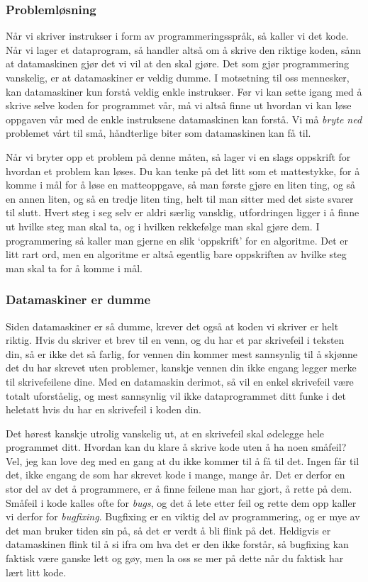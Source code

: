 \documentclass[a4paper, 11pt, notitlepage]{article}
\begin{document}
\subsubsection*{Problemløsning}

Når vi skriver instrukser i form av programmeringsspråk, så kaller vi det kode. Når vi lager et dataprogram, så handler altså om å skrive den riktige koden, sånn at datamaskinen gjør det vi vil at den skal gjøre. Det som gjør programmering vanskelig, er at datamaskiner er veldig dumme. I motsetning til oss mennesker, kan datamaskiner kun forstå veldig enkle instrukser. Før vi kan sette igang med å skrive selve koden for programmet vår, må vi altså finne ut hvordan vi kan løse oppgaven vår med de enkle instruksene datamaskinen kan forstå. Vi må \emph{bryte ned} problemet vårt til små, håndterlige biter som datamaskinen kan få til.

Når vi bryter opp et problem på denne måten, så lager vi en slags oppskrift for hvordan et problem kan løses. Du kan tenke på det litt som et mattestykke, for å komme i mål for å løse en matteoppgave, så man første gjøre en liten ting, og så en annen liten, og så en tredje liten ting, helt til man sitter med det siste svarer til slutt. Hvert steg i seg selv er aldri særlig vansklig, utfordringen ligger i å finne ut hvilke steg man skal ta, og i hvilken rekkefølge man skal gjøre dem. I programmering så kaller man gjerne en slik `oppskrift' for en algoritme. Det er litt rart ord, men en algoritme er altså egentlig bare oppskriften av hvilke steg man skal ta for å komme i mål.

\subsubsection*{Datamaskiner er dumme}

Siden datamaskiner er så dumme, krever det også at koden vi skriver er helt riktig. Hvis du skriver et brev til en venn, og du har et par skrivefeil i teksten din, så er ikke det så farlig, for vennen din kommer mest sannsynlig til å skjønne det du har skrevet uten problemer, kanskje vennen din ikke engang legger merke til skrivefeilene dine. Med en datamaskin derimot, så vil en enkel skrivefeil være totalt uforståelig, og mest sannsynlig vil ikke dataprogrammet ditt funke i det heletatt hvis du har en skrivefeil i koden din. 

Det hørest kanskje utrolig vanskelig ut, at en skrivefeil skal ødelegge hele programmet ditt. Hvordan kan du klare å skrive kode uten å ha noen småfeil? Vel, jeg kan love deg med en gang at du ikke kommer til å få til det. Ingen får til det, ikke engang de som har skrevet kode i mange, mange år. Det er derfor en stor del av det å programmere, er å finne feilene man har gjort, å rette på dem. Småfeil i kode kalles ofte for \emph{bugs}, og det å lete etter feil og rette dem opp kaller vi derfor for \emph{bugfixing}. Bugfixing er en viktig del av programmering, og er mye av det man bruker tiden sin på, så det er verdt å bli flink på det. Heldigvis er datamaskinen flink til å si ifra om hva det er den ikke forstår, så bugfixing kan faktisk være ganske lett og gøy, men la oss se mer på dette når du faktisk har lært litt kode.
\end{document}
